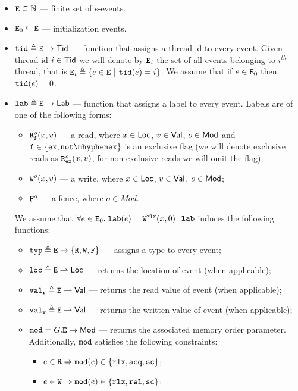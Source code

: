 \documentclass[12pt]{article}
\begin{document}
\begin{definition}
\begin{itemize}
  \item $\lE \subseteq \N$ --- finite set of s-events. 
  \item $\lEo \subseteq \lE$ --- initialization events.
  \item $\lTID \defeq \lE \fun \Tid$ --- function that assigns a thread id to every event.
    Given thread id $i \in \Tid$ we will denote by $\lEi{i}$ the set of all events belonging 
    to $i^{th}$ thread, that is $\lEi{i} \defeq \{e \in \lE ~|~ \lTID(e) = i\}$.
    We assume that if $e \in \lEo$ then $\lTID(e) = 0$.
  \item $\lLAB \defeq \lE \fun \Lab$ --- function that assigns a label to every event.
    Labels are of one of the following forms:
    \begin{itemize}
      \item $\rlabExExpl{o}{x}{v}{\mathtt{f}}$ --- a read, where
        $x \in \Loc$, $v \in \Val$, $o \in \Mod$ 
        and $\mathtt{f} \in \{\Ex, \NotEx\}$ is an exclusive flag 
        (we will denote exclusive reads as $\rlabEx{o}{x}{v}$,
        for non-exclusive reads we will omit the flag);
      \item $\wlab{o}{x}{v}$ --- a write, where $x \in \Loc$, $v \in \Val$, $o \in \Mod$;
      \item $\flab{o}$ --- a fence, where $o \in Mod$.
    \end{itemize}
    We assume that $\forall{e} \in \lEo. \; \lLAB(e) = \wlab{\rlx}{x}{0}$.
    $\lLAB$ induces the following functions:
    \begin{itemize}
      \item $\lTYP \defeq \lE \fun \{\lR, \lW, \lF\}$ --- assigns a type to every event;
      \item $\lLOC \defeq \lE \pfun \Loc $ --- returns the location of event (when applicable);
      \item $\lVALR \defeq \lE \pfun \Val$ --- returns the read value of event (when applicable);
      \item $\lVALW \defeq \lE \pfun \Val$ --- returns the written value of event
        (when applicable);
      \item $\lMOD = G.\lE \rightarrow \Mod$ --- returns the associated memory order parameter.
        Additionally, $\lMOD$ satisfies the following constraints:
        \begin{itemize}
        \item $e \in \lR \Rightarrow \lMOD(e) \in \{ \rlx, \acq, \sco \}$;
        \item $e \in \lW \Rightarrow \lMOD(e) \in \{ \rlx, \rel, \sco \}$;

\end{itemize}
\end{itemize}
\end{itemize}
\end{definition}
\end{document}
